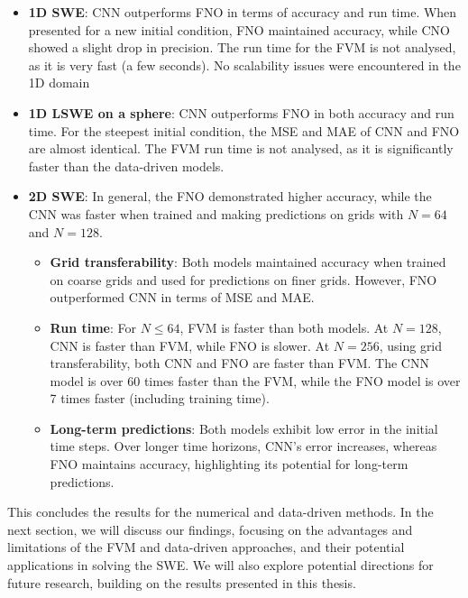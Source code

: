 \begin{itemize}
    \item \textbf{1D SWE}: CNN outperforms FNO in terms of accuracy and run time. 
        When presented for a new initial condition, FNO maintained accuracy, while CNO showed a slight drop in precision.
        The run time for the FVM is not analysed, as it is very fast (a few seconds).
        No scalability issues were encountered in the 1D domain
    \item \textbf{1D LSWE on a sphere}: CNN outperforms FNO in both accuracy and run time.
    For the steepest initial condition, the MSE and MAE of CNN and FNO are almost identical.
    The FVM run time is not analysed, as it is significantly faster than the data-driven models.
    \item \textbf{2D SWE}: In general, the FNO demonstrated higher accuracy, while the CNN was faster when trained and making predictions on grids with $N = 64$ and $N = 128$.
        \begin{itemize}
            \item \textbf{Grid transferability}: Both models maintained accuracy when trained on coarse grids and used for predictions on finer grids.
            However, FNO outperformed CNN in terms of MSE and MAE.
            \item \textbf{Run time}: For $N \leq 64$, FVM is faster than both models.
            At $N = 128$, CNN is faster than FVM, while FNO is slower.
            At $N = 256$, using grid transferability, both CNN and FNO are faster than FVM.
            The CNN model is over 60 times faster than the FVM, while the FNO model is over 7 times faster (including training time).
            \item \textbf{Long-term predictions}: Both models exhibit low error in the initial time steps.
            Over longer time horizons, CNN's error increases, whereas FNO maintains accuracy, highlighting its potential for long-term predictions.
            \end{itemize}
\end{itemize}
This concludes the results for the numerical and data-driven methods.
In the next section, we will discuss our findings, focusing on the advantages and limitations of the FVM and data-driven approaches, and their potential applications in solving the SWE.
We will also explore potential directions for future research, building on the results presented in this thesis.

